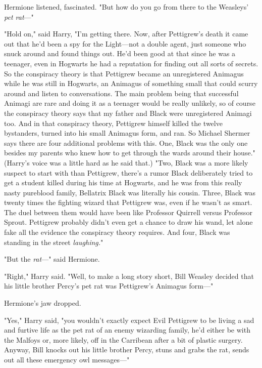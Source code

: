Hermione listened, fascinated. "But how do you go from there to the Weasleys' 
\emph{pet rat}---"

"Hold on," said Harry, "I'm getting there. Now, after Pettigrew's death it came 
out that he'd been a spy for the Light---not a double agent, just someone who 
snuck around and found things out. He'd been good at that since he was a 
teenager, even in Hogwarts he had a reputation for finding out all sorts of 
secrets. So the conspiracy theory is that Pettigrew became an unregistered 
Animagus while he was still in Hogwarts, an Animagus of something small that 
could scurry around and listen to conversations. The main problem being that 
successful Animagi are rare and doing it as a teenager would be really 
unlikely, so of course the conspiracy theory says that my father and Black were 
unregistered Animagi too. And in that conspiracy theory, Pettigrew himself 
killed the twelve bystanders, turned into his small Animagus form, and ran. So 
Michael Shermer says there are four additional problems with this. One, Black 
was the only one besides my parents who knew how to get through the wards 
around their house." (Harry's voice was a little hard as he said that.) "Two, 
Black was a more likely suspect to start with than Pettigrew, there's a rumor 
Black deliberately tried to get a student killed during his time at Hogwarts, 
and he was from this really nasty pureblood family, Bellatrix Black was 
literally his cousin. Three, Black was twenty times the fighting wizard that 
Pettigrew was, even if he wasn't as smart. The duel between them would have 
been like Professor Quirrell versus Professor Sprout. Pettigrew probably didn't 
even get a chance to draw his wand, let alone fake all the evidence the 
conspiracy theory requires. And four, Black was standing in the street 
\emph{laughing.}"

"But the \emph{rat}---" said Hermione.

"Right," Harry said. "Well, to make a long story short, Bill Weasley decided 
that his little brother Percy's pet rat was Pettigrew's Animagus form---"

Hermione's jaw dropped.

"Yes," Harry said, "you wouldn't exactly expect Evil Pettigrew to be living a 
sad and furtive life as the pet rat of an enemy wizarding family, he'd either 
be with the Malfoys or, more likely, off in the Carribean after a bit of 
plastic surgery. Anyway, Bill knocks out his little brother Percy, stuns and 
grabs the rat, sends out all these emergency owl messages---"

